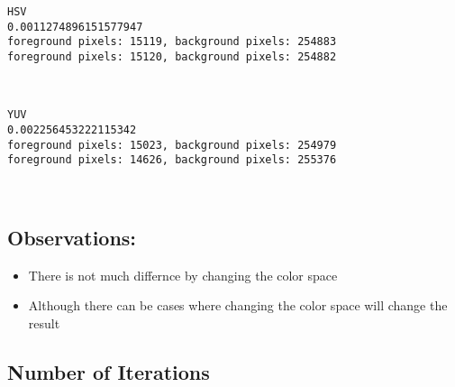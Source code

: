 \documentclass[11pt]{article}
\providecommand{\tightlist}{%
      \setlength{\itemsep}{0pt}\setlength{\parskip}{0pt}}
\begin{document}
    \begin{Verbatim}[commandchars=\\\{\}]
HSV
0.0011274896151577947
foreground pixels: 15119, background pixels: 254883
foreground pixels: 15120, background pixels: 254882

    \end{Verbatim}

    \begin{center}
    \end{center}
    { \hspace*{\fill} \\}
    
    \begin{Verbatim}[commandchars=\\\{\}]
YUV
0.002256453222115342
foreground pixels: 15023, background pixels: 254979
foreground pixels: 14626, background pixels: 255376

    \end{Verbatim}

    \begin{center}
    \end{center}
    { \hspace*{\fill} \\}
    
    \hypertarget{observations}{%
\subsection{Observations:}\label{observations}}

\begin{itemize}
\tightlist
\item
  There is not much differnce by changing the color space
\item
  Although there can be cases where changing the color space will change
  the result
\end{itemize}

    \hypertarget{number-of-iterations}{%
\subsection{Number of Iterations}\label{number-of-iterations}}
\end{document}
